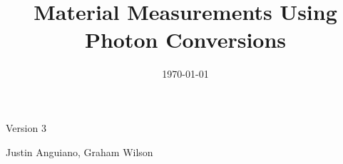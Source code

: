 \documentclass{cmspaper}
\begin{document}

\begin{titlepage}

   Version 3   %
   \date{\today}

  \title{Material Measurements Using Photon Conversions}

  \begin{Authlist}
    Justin Anguiano,
    Graham Wilson
  \end{Authlist}






\end{titlepage}

\setcounter{page}{2}%

%
%
%
%
%
%
\end{document}
